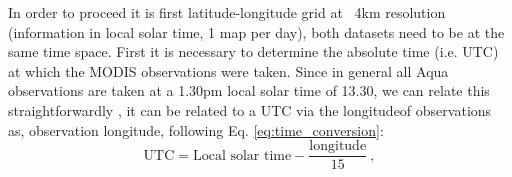 \documentclass[hess, twostagejnl]{copernicus}
\providecommand{\DIFadd}[1]{{\protect\color{blue} \sf #1}} %
\providecommand{\DIFdel}[1]{{\protect\color{red} \scriptsize #1}} %
\providecommand{\DIFaddbegin}{} %
\providecommand{\DIFaddend}{} %
\providecommand{\DIFdelbegin}{} %
\providecommand{\DIFdelend}{} %
\begin{document}
\DIFdel{In order to proceed it is first }\DIFdelend \DIFaddbegin \DIFadd{latitude-longitude grid at ~4km resolution (information in local solar time, 1 map per day), both datasets need to be at the same time space. First it is }\DIFaddend necessary to determine the absolute time (i.e. UTC) at which the MODIS observations were taken. Since \DIFaddbegin \DIFadd{in general }\DIFaddend all Aqua observations are taken at \DIFdelbegin \DIFdel{a }\DIFdelend \DIFaddbegin \DIFadd{1.30pm }\DIFaddend local solar time\DIFdelbegin \DIFdel{of 13.30, we can relate this straightforwardly }\DIFdelend \DIFaddbegin \DIFadd{, it can be related }\DIFaddend to a UTC via \DIFdelbegin \DIFdel{the longitudeof observations as, }%
\DIFdelend \DIFaddbegin \DIFadd{observation longitude, following Eq. \ref{eq:time_conversion}:
}\begin{equation}
	\text{UTC} = \text{Local solar time} - \frac{\text{longitude}}{15} \ , 
	\label{eq:time_conversion}
\end{equation}\DIFaddend 
\end{document}
